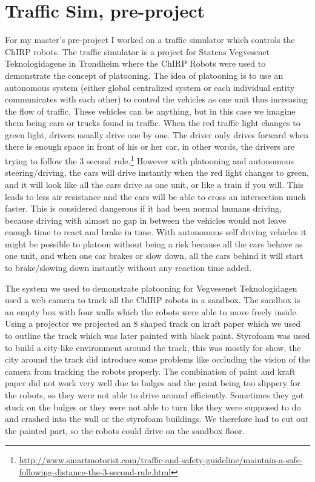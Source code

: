 \section{Traffic Sim, pre-project}
For my master's pre-project I worked on a traffic simulator which controls the ChIRP robots.
The traffic simulator is a project for Statens Vegvesenet Teknologidagene in Trondheim where the ChIRP Robots were used to demonstrate the concept of platooning. 
The idea of platooning is to use an autonomous system (either global centralized system or each individual entity communicates with each other) to control the vehicles as one unit thus increasing the flow of traffic. These vehicles can be anything, but in this case we imagine them being cars or trucks found in traffic. When the red traffic light changes to green light, drivers usually drive one by one. The driver only drives forward when there is enough space in front of his or her car, in other words, the drivers are trying to follow the 3 second rule.\footnote{\href{http://www.smartmotorist.com/traffic-and-safety-guideline/maintain-a-safe-following-distance-the-3-second-rule.html}{http://www.smartmotorist.com/traffic-and-safety-guideline/maintain-a-safe-following-distance-the-3-second-rule.html}}
However with platooning and autonomous steering/driving, the cars will drive instantly when the red light changes to green, and it will look like all the cars drive as one unit, or like a train if you will.
This leads to less air resistance and the cars will be able to cross an intersection much faster. This is considered dangerous if it had been normal humans driving, because driving with almost no gap in between the vehicles would not leave enough time to react and brake in time. With autonomous self driving vehicles it might be possible to platoon without being a risk because all the cars behave as one unit, and when one car brakes or slow down, all the cars behind it will start to brake/slowing down instantly without any reaction time added.

The system we used to demonstrate platooning for Vegvesenet Teknologidagen used a web camera to track all the ChIRP robots in a sandbox. The sandbox is an empty box with four walls which the robots were able to move freely inside. Using a projector we projected an 8 shaped track on kraft paper which we used to outline the track which was later painted with black paint. Styrofoam was used to build a city-like environment around the track, this was mostly for show, the city around the track did introduce some problems like occluding the vision of the camera from tracking the robots properly.
The combination of paint and kraft paper did not work very well due to bulges and the paint being too slippery for the robots, so they were not able to drive around efficiently. Sometimes they got stuck on the bulges or they were not able to turn like they were supposed to do and crashed into the wall or the styrofoam buildings.  We therefore had to cut out the painted part, so the robots could drive on the sandbox floor.

